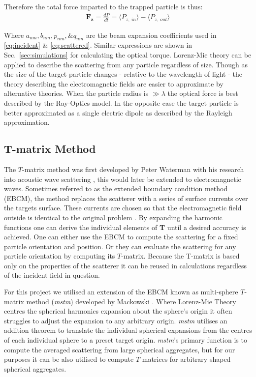 Therefore the total force imparted to the trapped particle is thus:
\begin{align}
	\boldsymbol{F_z} =\frac{dP}{dt} = \langle P_{z,\ in}\rangle 
	-\langle P_{z,\ out}\rangle
	\label{eq:Fz}
\end{align}

\noindent
Where $a_{nm}, b_{nm}, p_{nm}, \& q_{nm}$ are the beam expansion 
coefficients used in \eqref{eq:incident} \& \eqref{eq:scattered}.
Similar expressions are shown in Sec.~\ref{sec:simulations} for 
calculating the optical torque. Lorenz-Mie theory can be applied 
to describe the scattering from any particle regardless of size.
Though as the size of the target particle changes - relative to 
the wavelength of light - the theory describing the electromagnetic 
fields are easier to approximate by alternative theories. When the 
particle radius is $\gg \lambda$ the optical force is best described 
by the Ray-Optics model. In the opposite case the target particle is 
better approximated as a single electric dipole as described by 
the Rayleigh approximation.  
\subsection{T-matrix Method}
The $T$-matrix method was first developed by Peter Waterman with 
his research into acoustic wave scattering \cite{Waterman1969}, 
this would later be extended to electromagnetic waves. Sometimes 
referred to as the extended boundary condition method (EBCM), the 
method replaces the scatterer with a series of surface currents 
over the targets surface. These currents are chosen so that the 
electromagnetic field outside is identical to the original problem 
\cite{Wriedt1998}. By expanding the harmonic functions one can 
derive the individual elements of \textbf{T} until a desired 
accuracy is achieved. One can either use the EBCM to compute the 
scattering for a fixed particle orientation and position. Or they
can evaluate the scattering for any particle orientation by 
computing its $T$-matrix. Because the T-matrix is based only 
on the properties of the scatterer it can be reused in 
calculations regardless of the incident field in question.

For this project we utilised an extension of the EBCM known as 
multi-sphere $T$-matrix method (\textit{mstm}) developed by 
Mackowski \cite{Mackowski2011}. Where Lorenz-Mie Theory centres
the spherical harmonics expansion about the sphere's origin it
often struggles to adjust the expansion to any arbitrary origin.
\textit{mstm} utilises an addition theorem to translate the 
individual spherical expansions from the centres of each 
individual sphere to a preset target origin. \textit{mstm}'s 
primary function is to compute the averaged scattering from 
large spherical aggregates, but for our purposes it can be
also utilised to compute $T$ matrices for arbitrary shaped
spherical aggregates.

